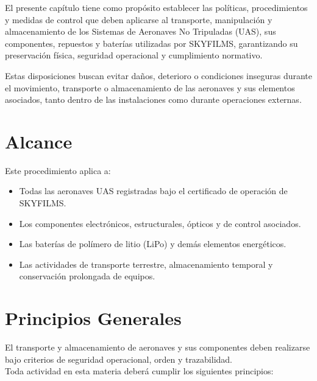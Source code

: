 El presente capítulo tiene como propósito establecer las políticas, procedimientos y medidas de control que deben aplicarse al transporte, manipulación y almacenamiento de los Sistemas de Aeronaves No Tripuladas (UAS), sus componentes, repuestos y baterías utilizadas por SKYFILMS, garantizando su preservación física, seguridad operacional y cumplimiento normativo.

Estas disposiciones buscan evitar daños, deterioro o condiciones inseguras durante el movimiento, transporte o almacenamiento de las aeronaves y sus elementos asociados, tanto dentro de las instalaciones como durante operaciones externas.

\section{Alcance}

Este procedimiento aplica a:

\begin{itemize}
    \item Todas las aeronaves UAS registradas bajo el certificado de operación de SKYFILMS.

    \item Los componentes electrónicos, estructurales, ópticos y de control asociados.

    \item Las baterías de polímero de litio (LiPo) y demás elementos energéticos.

    \item Las actividades de transporte terrestre, almacenamiento temporal y conservación prolongada de equipos.
\end{itemize}

\section{Principios Generales}
El transporte y almacenamiento de aeronaves y sus componentes deben realizarse bajo criterios de seguridad operacional, orden y trazabilidad.\\

Toda actividad en esta materia deberá cumplir los siguientes principios:

